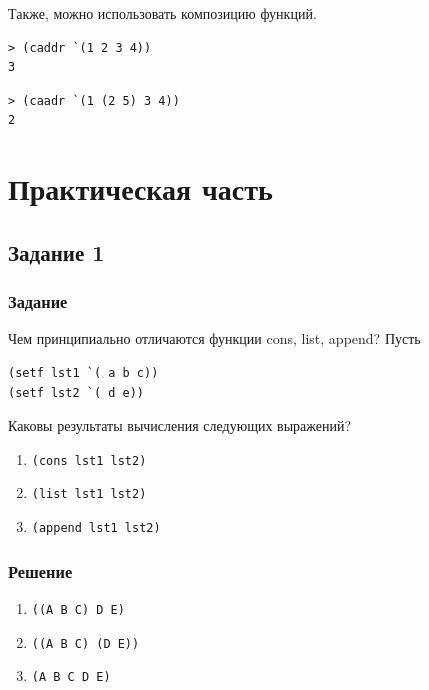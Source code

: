 Также, можно использовать композицию функций.

\begin{code}
\begin{verbatim}
> (caddr `(1 2 3 4))
3
\end{verbatim}
\end{code}

\begin{code}
\begin{verbatim}
> (caadr `(1 (2 5) 3 4))
2
\end{verbatim}
\end{code}


\newpage

\chapter{Практическая часть}
\section{Задание 1}
\subsection*{Задание}
Чем принципиально отличаются функции cons, list, append? Пусть 

\begin{code}
\begin{verbatim}
(setf lst1 `( a b c))
(setf lst2 `( d e))
\end{verbatim}
\end{code}

Каковы результаты вычисления следующих выражений?

\begin{enumerate}
	\item \texttt{(cons lst1 lst2)}
	\item \texttt{(list lst1 lst2)}
	\item \texttt{(append lst1 lst2)}
\end{enumerate}

\subsection*{Решение}
\begin{enumerate}
	\item \texttt{((A B C) D E)}
	\item \texttt{((A B C) (D E))}
	\item \texttt{(A B C D E)}
\end{enumerate}



